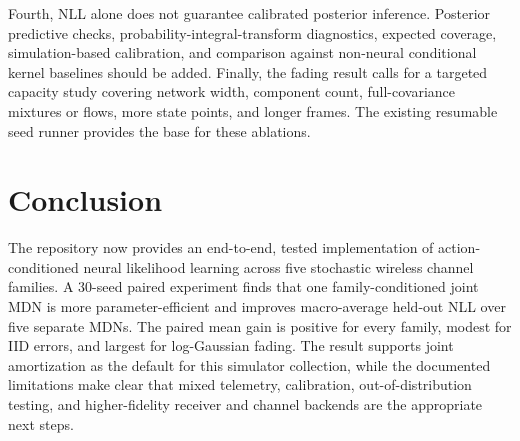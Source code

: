 \documentclass[10pt]{article}
\begin{document}
Fourth, NLL alone does not guarantee calibrated posterior inference. Posterior predictive checks, probability-integral-transform diagnostics, expected coverage, simulation-based calibration, and comparison against non-neural conditional kernel baselines should be added. Finally, the fading result calls for a targeted capacity study covering network width, component count, full-covariance mixtures or flows, more state points, and longer frames. The existing resumable seed runner provides the base for these ablations.

\section{Conclusion}

The repository now provides an end-to-end, tested implementation of action-conditioned neural likelihood learning across five stochastic wireless channel families. A 30-seed paired experiment finds that one family-conditioned joint MDN is more parameter-efficient and improves macro-average held-out NLL over five separate MDNs. The paired mean gain is positive for every family, modest for IID errors, and largest for log-Gaussian fading. The result supports joint amortization as the default for this simulator collection, while the documented limitations make clear that mixed telemetry, calibration, out-of-distribution testing, and higher-fidelity receiver and channel backends are the appropriate next steps.



\end{document}
